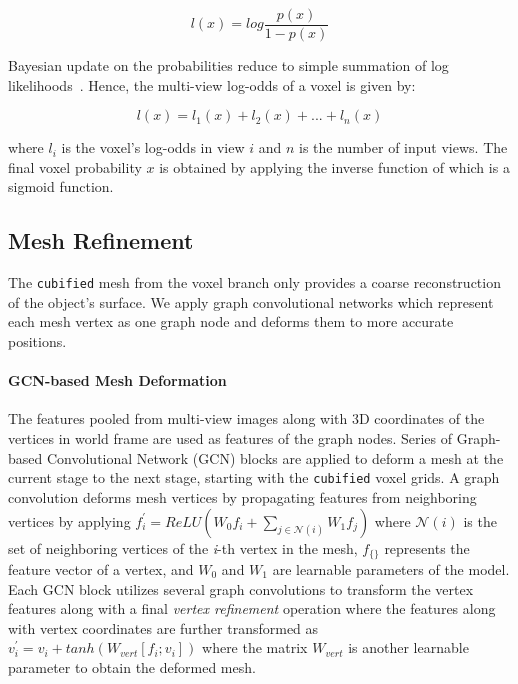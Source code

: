 \begin{equation}
    l(x) = log \frac{p(x)}{1 - p(x)}
    \label{equ:logodds}
\end{equation}

Bayesian update on the probabilities reduce to simple summation of log likelihoods~\cite{konolige1997improved}. Hence, the multi-view log-odds of a voxel is given by:

\begin{equation}
    l(x) = l_1(x) + l_2(x) + ... + l_n(x)
    \label{equ:logodds_sum}
\end{equation}

\noindent where $l_i$ is the voxel's log-odds in view $i$ and $n$ is the number of input views.
The final voxel probability $x$ is obtained by applying the inverse function of  which is a sigmoid function.


\subsection{Mesh Refinement}
The \texttt{cubified} mesh from the voxel branch only provides a coarse reconstruction of the object's surface. We apply graph convolutional networks which represent each mesh vertex as one graph node and deforms them to more accurate positions.

\paragraph{GCN-based Mesh Deformation}
The features pooled from multi-view images along with 3D coordinates of the vertices in world frame are used as features of the graph nodes.
Series of Graph-based Convolutional Network (GCN) blocks are applied to deform a mesh at the current stage to the next stage, starting with the \texttt{cubified} voxel grids.
A graph convolution deforms mesh vertices by propagating features from neighboring vertices by applying
$f_{i}^{'} = ReLU(W_0f_i + \sum_{j \in \mathcal{N}(i)} W_1 f_j)$ where $\mathcal{N}(i)$ is the set of neighboring vertices of the \emph{i}-th vertex in the mesh, $f_{\{\}}$ represents the feature vector of a vertex, and $W_0$ and $W_1$ are learnable parameters of the model.
Each GCN block utilizes several graph convolutions to transform the vertex features along with a final \emph{vertex refinement} operation where the features along with vertex coordinates are further transformed as $v_i^{'} = v_i + tanh(W_{vert}[f_i;v_i])$ where the matrix $W_{vert}$ is another learnable parameter to obtain the deformed mesh.

